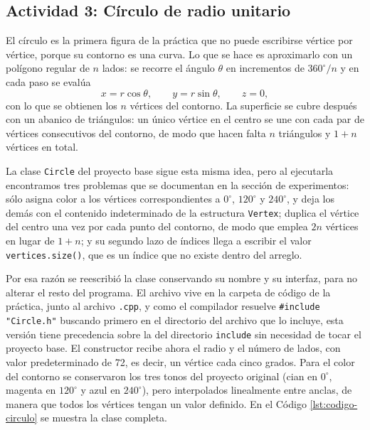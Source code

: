 \subsection{Actividad 3: Círculo de radio unitario}
El círculo es la primera figura de la práctica que no puede escribirse vértice
por vértice, porque su contorno es una curva. Lo que se hace es aproximarlo con
un polígono regular de $n$ lados: se recorre el ángulo $\theta$ en incrementos
de $360^\circ/n$ y en cada paso se evalúa
\[
    x = r\cos\theta, \qquad y = r\sin\theta, \qquad z = 0,
\]
con lo que se obtienen los $n$ vértices del contorno. La superficie se cubre
después con un abanico de triángulos: un único vértice en el centro se une con
cada par de vértices consecutivos del contorno, de modo que hacen falta $n$
triángulos y $1+n$ vértices en total.

La clase \texttt{Circle} del proyecto base sigue esta misma idea, pero al
ejecutarla encontramos tres problemas que se documentan en la sección de
experimentos: sólo asigna color a los vértices correspondientes a
$0^\circ$, $120^\circ$ y $240^\circ$, y deja los demás con el contenido
indeterminado de la estructura \texttt{Vertex}; duplica el vértice del centro
una vez por cada punto del contorno, de modo que emplea $2n$ vértices en lugar
de $1+n$; y su segundo lazo de índices llega a escribir el valor
\texttt{vertices.size()}, que es un índice que no existe dentro del arreglo.

Por esa razón se reescribió la clase conservando su nombre y su interfaz, para
no alterar el resto del programa. El archivo vive en la carpeta de código de la
práctica, junto al archivo \texttt{.cpp}, y como el compilador resuelve
\texttt{\#include "Circle.h"} buscando primero en el directorio del archivo que
lo incluye, esta versión tiene precedencia sobre la del directorio
\texttt{include} sin necesidad de tocar el proyecto base. El constructor recibe
ahora el radio y el número de lados, con valor predeterminado de 72, es decir,
un vértice cada cinco grados. Para el color del contorno se conservaron los
tres tonos del proyecto original (cian en $0^\circ$, magenta en $120^\circ$ y
azul en $240^\circ$), pero interpolados linealmente entre anclas, de manera que
todos los vértices tengan un valor definido. En el Código
\ref{lst:codigo-circulo} se muestra la clase completa.

